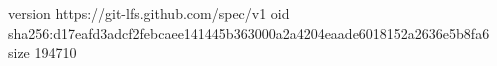version https://git-lfs.github.com/spec/v1
oid sha256:d17eafd3adcf2febcaee141445b363000a2a4204eaade6018152a2636e5b8fa6
size 194710
